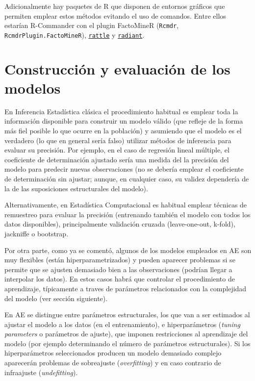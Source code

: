 \documentclass[
  spanish,
]{book}
\theoremstyle{break}
\theoremstyle{definition}
\theoremstyle{definition}
\theoremstyle{definition}
\theoremstyle{definition}
\theoremstyle{remark}
\begin{document}
Adicionalmente hay paquetes de R que disponen de entornos gráficos que permiten emplear estos métodos evitando el uso de comandos.
Entre ellos estarían R-Commander con el plugin FactoMineR (\texttt{Rcmdr}, \texttt{RcmdrPlugin.FactoMineR}), \href{https://rattle.togaware.com}{\texttt{rattle}} y \href{https://github.com/radiant-rstats/radiant}{\texttt{radiant}}.

\hypertarget{const-eval}{%
\section{Construcción y evaluación de los modelos}\label{const-eval}}

En Inferencia Estadística clásica el procedimiento habitual es emplear toda la información disponible para construir un modelo válido (que refleje de la forma más fiel posible lo que ocurre en la población) y asumiendo que el modelo es el verdadero (lo que en general sería falso) utilizar métodos de inferencia para evaluar su precisión.
Por ejemplo, en el caso de regresión lineal múltiple, el coeficiente de determinación ajustado sería una medida del la precisión del modelo para predecir nuevas observaciones (no se debería emplear el coeficiente de determinación sin ajustar; aunque, en cualquier caso, su validez dependería de la de las suposiciones estructurales del modelo).

Alternativamente, en Estadística Computacional es habitual emplear técnicas de remuestreo para evaluar la precisión (entrenando también el modelo con todos los datos disponibles), principalmente validación cruzada (leave-one-out, k-fold), jackniffe o bootstrap.

Por otra parte, como ya se comentó, algunos de los modelos empleados en AE son muy flexibles (están hiperparametrizados) y pueden aparecer problemas si se permite que se ajusten demasiado bien a las observaciones (podrían llegar a interpolar los datos).
En estos casos habrá que controlar el procedimiento de aprendizaje, típicamente a traves de parámetros relacionados con la complejidad del modelo (ver sección siguiente).

En AE se distingue entre parámetros estructurales, los que van a ser estimados al ajustar el modelo a los datos (en el entrenamiento), e hiperparámetros (\emph{tuning parameters} o parámetros de ajuste), que imponen restricciones al aprendizaje del modelo (por ejemplo determinando el número de parámetros estructurales).
Si los hiperparámetros seleccionados producen un modelo demasiado complejo aparecerán problemas de sobreajuste (\emph{overfitting}) y en caso contrario de infraajuste (\emph{undefitting}).
\end{document}
